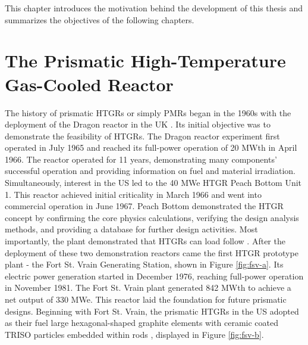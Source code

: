 This chapter introduces the motivation behind the development of this thesis and summarizes the objectives of the following chapters.

\section{The Prismatic High-Temperature Gas-Cooled Reactor}
\label{sec:pmr}

The history of prismatic \glspl{HTGR} or simply \glspl{PMR} began in the 1960s with the deployment of the Dragon reactor in the \gls{UK} \cite{brey_development_2001}.
Its initial objective was to demonstrate the feasibility of \glspl{HTGR}.
The Dragon reactor experiment first operated in July 1965 and reached its full-power operation of 20 MWth in April 1966.
The reactor operated for 11 years, demonstrating many components' successful operation and providing information on fuel and material irradiation.
Simultaneously, interest in the \gls{US} led to the 40 MWe \gls{HTGR} Peach Bottom Unit 1.
This reactor achieved initial criticality in March 1966 and went into commercial operation in June 1967.
Peach Bottom demonstrated the \gls{HTGR} concept by confirming the core physics calculations, verifying the design analysis methods, and providing a database for further design activities.
Most importantly, the plant demonstrated that \glspl{HTGR} can load follow \cite{brey_development_2001}.
After the deployment of these two demonstration reactors came the first \gls{HTGR} prototype plant - the Fort St. Vrain Generating Station, shown in Figure \ref{fig:fsv-a}.
Its electric power generation started in December 1976, reaching full-power operation in November 1981.
The Fort St. Vrain plant generated 842 MWth to achieve a net output of 330 MWe.
This reactor laid the foundation for future prismatic designs.
Beginning with Fort St. Vrain, the prismatic HTGRs in the \gls{US} adopted as their fuel large hexagonal-shaped graphite elements with ceramic coated \gls{TRISO} particles embedded within rods \cite{brey_development_2001}, displayed in Figure \ref{fig:fsv-b}.

